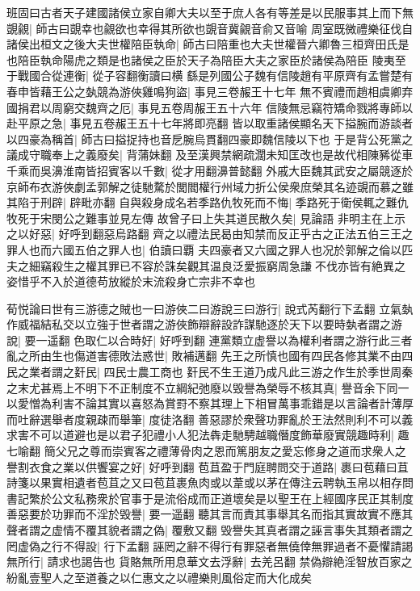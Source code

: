 班固曰古者天子建國諸侯立家自卿大夫以至于庶人各有等差是以民服事其上而下無覬覦|{
	師古曰覬幸也覦欲也幸得其所欲也覬音冀覦音俞又音喻}
周室既微禮樂征伐自諸侯出桓文之後大夫世權陪臣執命|{
	師古曰陪重也大夫世權晉六卿魯三桓齊田氏是也陪臣執命陽虎之類是也諸侯之臣於天子為陪臣大夫之家臣於諸侯為陪臣}
陵夷至于戰國合從連衡|{
	從子容翻衡讀曰横}
繇是列國公子魏有信陵趙有平原齊有孟嘗楚有春申皆藉王公之埶競為游俠雞鳴狗盜|{
	事見三卷赧王十七年}
無不賓禮而趙相虞卿弃國捐君以周窮交魏齊之厄|{
	事見五卷周赧王五十六年}
信陵無忌竊符矯命戮將專師以赴平原之急|{
	事見五卷赧王五十七年將即亮翻}
皆以取重諸侯顯名天下搤腕而游談者以四豪為稱首|{
	師古曰搤捉持也音戹腕烏貫翻四豪即魏信陵以下也}
于是背公死黨之議成守職奉上之義廢矣|{
	背蒲妹翻}
及至漢興禁網疏濶未知匡改也是故代相陳豨從車千乘而吳濞淮南皆招賓客以千數|{
	從才用翻濞普懿翻}
外戚大臣魏其武安之屬競逐於京師布衣游俠劇孟郭解之徒馳騖於閭閻權行州域力折公侯衆庶榮其名迹覬而慕之雖其陷于刑辟|{
	辟毗亦翻}
自與殺身成名若季路仇牧死而不悔|{
	季路死于衛侯輒之難仇牧死于宋閔公之難事並見左傳}
故曾子曰上失其道民散久矣|{
	見論語}
非明主在上示之以好惡|{
	好呼到翻惡烏路翻}
齊之以禮法民曷由知禁而反正乎古之正法五伯三王之罪人也而六國五伯之罪人也|{
	伯讀曰覇}
夫四豪者又六國之罪人也况於郭解之倫以匹夫之細竊殺生之權其罪已不容於誅矣觀其温良泛愛振窮周急謙不伐亦皆有絶異之姿惜乎不入於道德苟放縱於末流殺身亡宗非不幸也

荀悦論曰世有三游德之賊也一曰游俠二曰游說三曰游行|{
	說式芮翻行下孟翻}
立氣埶作威福結私交以立強于世者謂之游俠飾辯辭設詐謀馳逐於天下以要時埶者謂之游說|{
	要一遥翻}
色取仁以合時好|{
	好呼到翻}
連黨類立虚譽以為權利者謂之游行此三者亂之所由生也傷道害德敗法惑世|{
	敗補邁翻}
先王之所慎也國有四民各修其業不由四民之業者謂之姧民|{
	四民士農工商也}
姧民不生王道乃成凡此三游之作生於季世周秦之末尤甚焉上不明下不正制度不立綱紀弛廢以毁譽為榮辱不核其真|{
	譽音余下同一}
以愛憎為利害不論其實以喜怒為賞罸不察其理上下相冒萬事乖錯是以言論者計薄厚而吐辭選舉者度親疎而舉筆|{
	度徒洛翻}
善惡謬於衆聲功罪亂於王法然則利不可以義求害不可以道避也是以君子犯禮小人犯法犇走馳騁越職僭度飾華廢實競趣時利|{
	趣七喻翻}
簡父兄之尊而崇賓客之禮薄骨肉之恩而篤朋友之愛忘修身之道而求衆人之譽割衣食之業以供饗宴之好|{
	好呼到翻}
苞苴盈于門庭聘問交于道路|{
	裹曰苞藉曰苴詩箋以果實相遺者苞苴之又曰苞苴裹魚肉或以葦或以茅在傳注云聘執玉帛以相存問}
書記繁於公文私務衆於官事于是流俗成而正道壞矣是以聖王在上經國序民正其制度善惡要於功罪而不淫於毁譽|{
	要一遥翻}
聽其言而責其事舉其名而指其實故實不應其聲者謂之虚情不覆其貌者謂之偽|{
	覆敷又翻}
毁譽失其真者謂之誣言事失其類者謂之罔虚偽之行不得設|{
	行下孟翻}
誣罔之辭不得行有罪惡者無僥倖無罪過者不憂懼請謁無所行|{
	請求也謁告也}
貨賂無所用息華文去浮辭|{
	去羌呂翻}
禁偽辯絶淫智放百家之紛亂壹聖人之至道養之以仁惠文之以禮樂則風俗定而大化成矣

